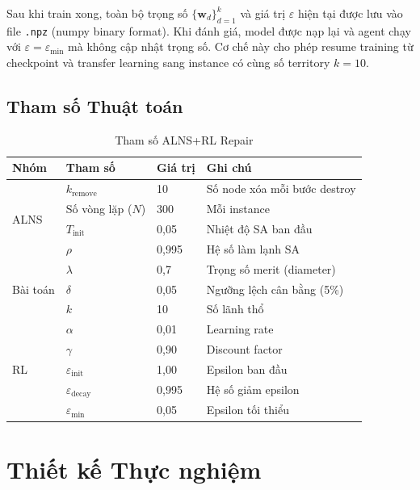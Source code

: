 \documentclass[12pt, a4paper]{article}
\begin{document}
Sau khi train xong, toàn bộ trọng số $\{\mathbf{w}_d\}_{d=1}^k$ và giá trị
$\varepsilon$ hiện tại được lưu vào file \texttt{.npz} (numpy binary format).
Khi đánh giá, model được nạp lại và agent chạy với $\varepsilon = \varepsilon_{\min}$
mà không cập nhật trọng số. Cơ chế này cho phép resume training từ checkpoint
và transfer learning sang instance có cùng số territory $k = 10$.

\subsection{Tham số Thuật toán}

\begin{table}[H]
  \centering
  \caption{Tham số ALNS+RL Repair}
  \begin{tabular}{llll}
    \toprule
    Nhóm & Tham số & Giá trị & Ghi chú \\
    \midrule
    \multirow{4}{*}{ALNS} &
    $k_{\text{remove}}$ & 10 & Số node xóa mỗi bước destroy \\
    & Số vòng lặp ($N$) & 300 & Mỗi instance \\
    & $T_{\text{init}}$ & 0{,}05 & Nhiệt độ SA ban đầu \\
    & $\rho$ & 0{,}995 & Hệ số làm lạnh SA \\
    \midrule
    \multirow{3}{*}{Bài toán} &
    $\lambda$ & 0{,}7 & Trọng số merit (diameter) \\
    & $\delta$ & 0{,}05 & Ngưỡng lệch cân bằng (5\%) \\
    & $k$ & 10 & Số lãnh thổ \\
    \midrule
    \multirow{5}{*}{RL} &
    $\alpha$ & 0{,}01 & Learning rate \\
    & $\gamma$ & 0{,}90 & Discount factor \\
    & $\varepsilon_{\text{init}}$ & 1{,}00 & Epsilon ban đầu \\
    & $\varepsilon_{\text{decay}}$ & 0{,}995 & Hệ số giảm epsilon \\
    & $\varepsilon_{\min}$ & 0{,}05 & Epsilon tối thiểu \\
    \bottomrule
  \end{tabular}
\end{table}

\section{Thiết kế Thực nghiệm}
\label{sec:experiment}
\end{document}
